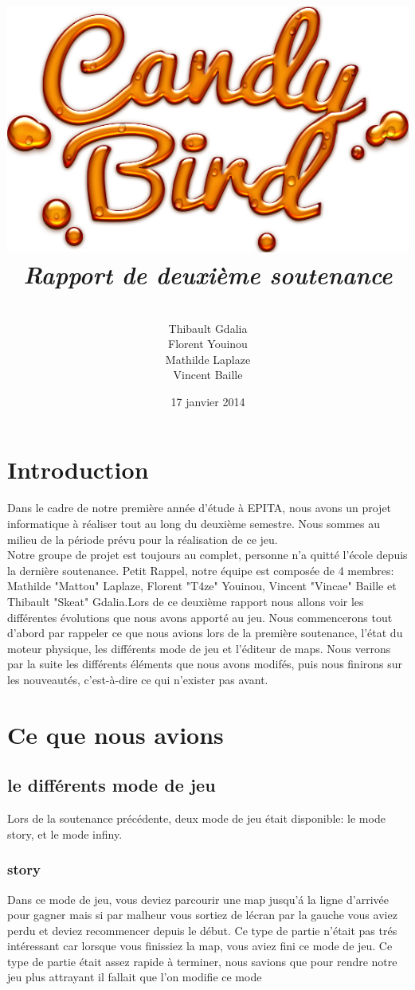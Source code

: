 \documentclass [11pt]{report}
\title{
	\includegraphics[scale=0.43]{images/Logojeu.png}
	 \\\vspace{20mm}
	\textbf{\Huge \itshape Rapport de deuxi\`eme soutenance  }
	}
\author{ \\\vspace{2mm}
	Thibault Gdalia\\\vspace{2mm}
	Florent Youinou\\\vspace{2mm}
	Mathilde Laplaze\\\vspace{2mm}
	Vincent Baille \\\vspace{30mm}
	}
\date{17 janvier 2014}
\begin{document}
\thispagestyle{fancy}
\renewcommand{\baselinestretch}{0.001}
\maketitle
\tableofcontents
\chapter*{Introduction} 
Dans le cadre de notre premi\`ere ann\'ee d'\'etude \`a EPITA, nous avons un projet informatique \`a r\'ealiser tout au long du deuxi\`eme semestre. Nous sommes au milieu de la p\'eriode pr\'evu pour la r\'ealisation de ce jeu. \\

Notre groupe de projet est toujours au complet, personne n'a quitt\'e l'\'ecole depuis la derni\`ere soutenance. Petit Rappel, notre \'equipe est compos\'ee de 4 membres: Mathilde "Mattou" Laplaze, Florent "T4ze" Youinou, Vincent "Vincae" Baille et Thibault "Skeat" Gdalia.Lors de ce deuxi\`eme rapport nous allons voir les diff\'erentes \'evolutions que nous avons apport\'e au jeu. Nous commencerons tout d'abord par rappeler ce que nous avions lors de la premi\`ere soutenance, l'\'etat du moteur physique, les diff\'erents mode de jeu et l'\'editeur de maps. Nous verrons par la suite les diff\'erents \'el\'ements que nous avons modif\'es, puis nous finirons sur les nouveaut\'es, c'est-\`a-dire ce qui n'exister pas avant.

\chapter{Ce que nous avions}
	\section{le diff\'erents mode de jeu}
		Lors de la soutenance pr\'ec\'edente, deux mode de jeu \'etait disponible: le mode story, et le mode infiny.
		\subsection{story}
			Dans ce mode de jeu, vous deviez parcourir une map jusqu'\'a la ligne d'arriv\'ee pour gagner mais si par malheur vous sortiez de l\'ecran par la gauche vous aviez perdu et deviez recommencer depuis le d\'ebut. Ce type de partie n'\'etait pas tr\'es int\'eressant car lorsque vous finissiez la map, vous aviez fini ce mode de jeu. Ce type de partie \'etait assez rapide \`a terminer, nous savions que pour rendre notre jeu plus attrayant il fallait que l'on modifie ce mode 
\end{document}
